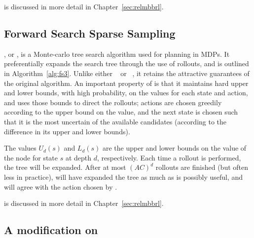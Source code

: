  is discussed in more detail in Chapter~\ref{sec:relmbbrl}.

\subsection{Forward Search Sparse Sampling}

, or , is a Monte-carlo tree search algorithm used for planning in MDPs. It preferentially expands the search tree through the use of rollouts, and is outlined in Algorithm~\ref{alg:fs3}. Unlike either ~\cite{wang05} or ~\cite{kocsis06}, it retains the attractive guarantees of the original  algorithm. An important property of  is that it maintains hard upper and lower bounds, with high probability, on the values for each state and action, and uses those bounds to direct the rollouts; actions are chosen greedily according to the upper bound on the value, and the next state is chosen such that it is the most uncertain of the available candidates (according to the difference in its upper and lower bounds).

The values $U_d(s)$ and $L_d(s)$ are the upper and lower bounds on the value of the node for state $s$ at depth $d$, respectively. Each time a rollout is performed, the tree will be expanded. After at most $(AC)^d$ rollouts are finished (but often less in practice),  will have expanded the tree as much as is possibly useful, and will agree with the action chosen by .

 is discussed in more detail in Chapter~\ref{sec:relmbbrl}.

\subsection{A modification on }
\label{sec:bfs3:fsss-modification}

